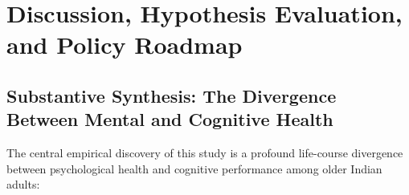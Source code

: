 
\section{Discussion, Hypothesis Evaluation, and Policy Roadmap}

\subsection{Substantive Synthesis: The Divergence Between Mental and Cognitive Health}
The central empirical discovery of this study is a profound life-course divergence between psychological health and cognitive performance among older Indian adults:

